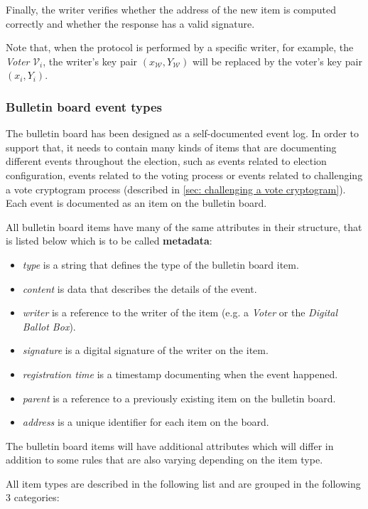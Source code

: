 Finally, the writer verifies whether the address of the new item is computed correctly and whether the response has a valid signature.

Note that, when the protocol is performed by a specific writer, for example, the \textit{Voter} $\mathcal{V}_i$, the writer's key pair $(x_\mathcal{W}, Y_\mathcal{W})$ will be replaced by the voter's key pair $(x_i, Y_i)$.


\subsubsection{Bulletin board event types} \label{sec: bulletin board event types}
The bulletin board has been designed as a self-documented event log. In order to support that, it needs to contain many kinds of items that are documenting different events throughout the election, such as events related to election configuration, events related to the voting process or events related to challenging a vote cryptogram process (described in \cref{sec: challenging a vote cryptogram}). Each event is documented as an item on the bulletin board.

All bulletin board items have many of the same attributes in their structure, that is listed below which is to be called \textbf{metadata}:
\begin{itemize}
    \item \textit{type} is a string that defines the type of the bulletin board item.
    \item \textit{content} is data that describes the details of the event.
    \item \textit{writer} is a reference to the writer of the item (e.g. a \textit{Voter} or the \textit{Digital Ballot Box}).
    \item \textit{signature} is a digital signature of the writer on the item.
    \item \textit{registration time} is a timestamp documenting when the event happened.
    \item \textit{parent} is a reference to a previously existing item on the bulletin board.
    \item \textit{address} is a unique identifier for each item on the board.
\end{itemize}

The bulletin board items will have additional attributes which will differ in addition to some rules that are also varying depending on the item type.

All item types are described in the following list and are grouped in the following 3 categories:

